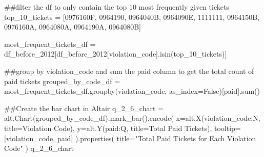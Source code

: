 \documentclass[
]{article}
\newenvironment{Shaded}{\begin{snugshade}}{\end{snugshade}}
\newcommand{\BuiltInTok}[1]{\textcolor[rgb]{0.00,0.23,0.31}{#1}}
\newcommand{\CommentTok}[1]{\textcolor[rgb]{0.37,0.37,0.37}{#1}}
\newcommand{\NormalTok}[1]{\textcolor[rgb]{0.00,0.23,0.31}{#1}}
\newcommand{\OperatorTok}[1]{\textcolor[rgb]{0.37,0.37,0.37}{#1}}
\newcommand{\StringTok}[1]{\textcolor[rgb]{0.13,0.47,0.30}{#1}}
\newcommand{\VariableTok}[1]{\textcolor[rgb]{0.07,0.07,0.07}{#1}}
\begin{document}
\begin{Shaded}
\begin{Highlighting}[]
\CommentTok{\#\#filter the df to only contain the top 10 most frequently given tickets}
\NormalTok{top\_10\_tickets }\OperatorTok{=}\NormalTok{ [}\StringTok{\textquotesingle{}0976160F\textquotesingle{}}\NormalTok{, }\StringTok{\textquotesingle{}0964190\textquotesingle{}}\NormalTok{, }\StringTok{\textquotesingle{}0964040B\textquotesingle{}}\NormalTok{, }\StringTok{\textquotesingle{}0964090E\textquotesingle{}}\NormalTok{, }\StringTok{\textquotesingle{}1111111\textquotesingle{}}\NormalTok{, }\StringTok{\textquotesingle{}0964150B\textquotesingle{}}\NormalTok{, }\StringTok{\textquotesingle{}0976160A\textquotesingle{}}\NormalTok{, }\StringTok{\textquotesingle{}0964080A\textquotesingle{}}\NormalTok{, }\StringTok{\textquotesingle{}0964190A\textquotesingle{}}\NormalTok{, }\StringTok{\textquotesingle{}0964080B\textquotesingle{}}\NormalTok{]}

\NormalTok{most\_frequent\_tickets\_df }\OperatorTok{=}\NormalTok{ df\_before\_2012[df\_before\_2012[}\StringTok{\textquotesingle{}violation\_code\textquotesingle{}}\NormalTok{].isin(top\_10\_tickets)]}

\CommentTok{\#\#group by \textquotesingle{}violation\_code\textquotesingle{} and sum the \textquotesingle{}paid\textquotesingle{} column to get the total count of paid tickets}
\NormalTok{grouped\_by\_code\_df }\OperatorTok{=}\NormalTok{ most\_frequent\_tickets\_df.groupby(}\StringTok{\textquotesingle{}violation\_code\textquotesingle{}}\NormalTok{, as\_index}\OperatorTok{=}\VariableTok{False}\NormalTok{)[}\StringTok{\textquotesingle{}paid\textquotesingle{}}\NormalTok{].}\BuiltInTok{sum}\NormalTok{()}
\end{Highlighting}
\end{Shaded}

\begin{Shaded}
\begin{Highlighting}[]
\CommentTok{\#\#Create the bar chart in Altair}
\NormalTok{q\_2\_6\_chart }\OperatorTok{=}\NormalTok{ alt.Chart(grouped\_by\_code\_df).mark\_bar().encode(}
\NormalTok{    x}\OperatorTok{=}\NormalTok{alt.X(}\StringTok{\textquotesingle{}violation\_code:N\textquotesingle{}}\NormalTok{, title}\OperatorTok{=}\StringTok{\textquotesingle{}Violation Code\textquotesingle{}}\NormalTok{),}
\NormalTok{    y}\OperatorTok{=}\NormalTok{alt.Y(}\StringTok{\textquotesingle{}paid:Q\textquotesingle{}}\NormalTok{, title}\OperatorTok{=}\StringTok{\textquotesingle{}Total Paid Tickets\textquotesingle{}}\NormalTok{),}
\NormalTok{    tooltip}\OperatorTok{=}\NormalTok{[}\StringTok{\textquotesingle{}violation\_code\textquotesingle{}}\NormalTok{, }\StringTok{\textquotesingle{}paid\textquotesingle{}}\NormalTok{]}
\NormalTok{).properties(}
\NormalTok{    title}\OperatorTok{=}\StringTok{"Total Paid Tickets for Each Violation Code"}
\NormalTok{)}
\NormalTok{q\_2\_6\_chart}
\end{Highlighting}
\end{Shaded}
\end{document}
